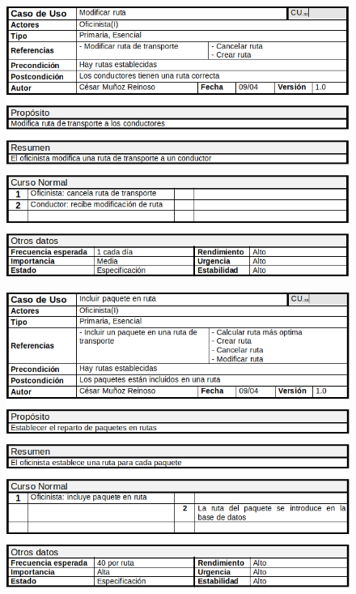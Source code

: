 \begin{figure}[H]
	\centering
	\includegraphics[width=16cm]{32}
\end{figure}
\begin{figure}[H]
	\centering
	\includegraphics[width=16cm]{33}
\end{figure}
